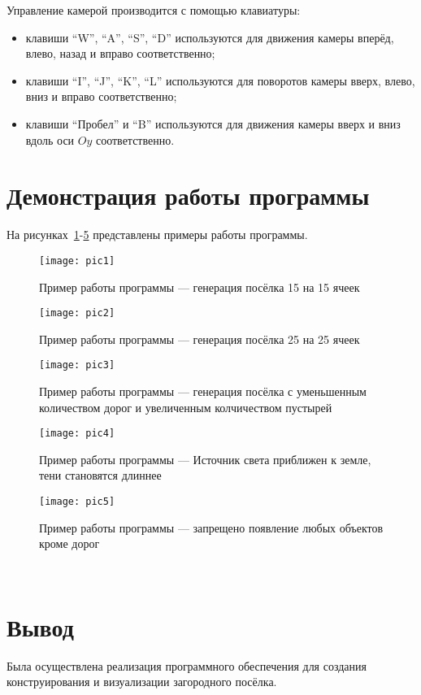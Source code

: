 Управление камерой производится с помощью клавиатуры:
\begin{itemize}
  \item клавиши ``W'', ``A'', ``S'', ``D'' используются для движения камеры вперёд, влево, назад и вправо соответственно;
  \item клавиши ``I'', ``J'', ``K'', ``L'' используются для поворотов камеры вверх, влево, вниз и вправо соответственно;
  \item клавиши ``Пробел'' и ``B'' используются для движения камеры вверх и вниз вдоль оси $Oy$ соответственно.
\end{itemize}



\section{Демонстрация работы программы}

На рисунках~\ref{fig:example_1}-\ref{fig:example_5} представлены примеры работы программы.

\begin{figure}[h!]
  \texttt{[image: pic1]}
  \caption{Пример работы программы --- генерация посёлка 15 на 15 ячеек}
  \label{fig:example_1}
\end{figure}
\begin{figure}[h!]
  \texttt{[image: pic2]}
  \caption{Пример работы программы ---  генерация посёлка 25 на 25 ячеек}
  \label{fig:example_2}
\end{figure}
\begin{figure}[h!]
  \texttt{[image: pic3]}
  \caption{Пример работы программы --- генерация посёлка с уменьшенным количеством дорог и увеличенным колчичеством пустырей}
  \label{fig:example_3}
\end{figure}
\begin{figure}[h!]
  \texttt{[image: pic4]}
  \caption{Пример работы программы --- Источник света приближен к земле, тени становятся длиннее}
  \label{fig:example_4}
\end{figure}
\begin{figure}[h!]
  \texttt{[image: pic5]}
  \caption{Пример работы программы --- запрещено появление любых объектов кроме дорог}
  \label{fig:example_5}
\end{figure}

\newpage

\

\section{Вывод}

Была осуществлена реализация программного обеспечения для создания конструирования и визуализации загородного посёлка.